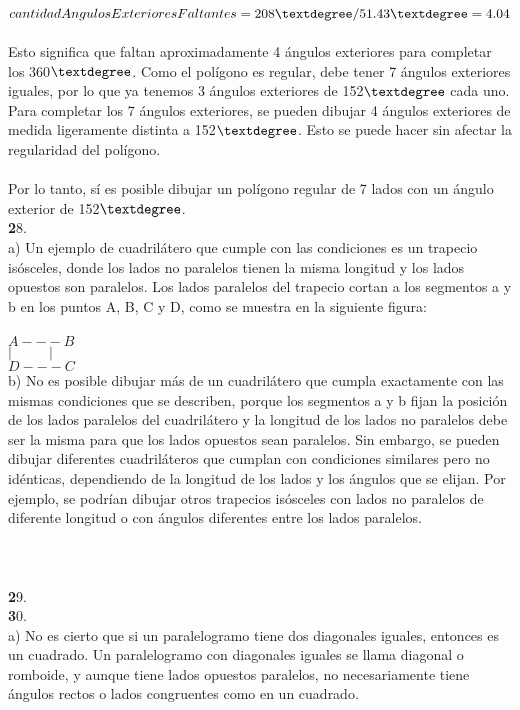 \documentclass{article}
\begin{document}
\\
$cantidadAngulosExterioresFaltantes = 208\textdegree / 51.43\textdegree = 4.04$\\
\\
Esto significa que faltan aproximadamente 4 ángulos exteriores para completar los 360$\textdegree$. Como el polígono es regular, debe tener 7 ángulos exteriores iguales, por lo que ya tenemos 3 ángulos exteriores de 152$\textdegree$ cada uno. Para completar los 7 ángulos exteriores, se pueden dibujar 4 ángulos exteriores de medida ligeramente distinta a 152$\textdegree$. Esto se puede hacer sin afectar la regularidad del polígono.\\
\\
Por lo tanto, sí es posible dibujar un polígono regular de 7 lados con un ángulo exterior de 152$\textdegree$.\\
{\textbf 28. }\\
a) Un ejemplo de cuadrilátero que cumple con las condiciones es un trapecio isósceles, donde los lados no paralelos tienen la misma longitud y los lados opuestos son paralelos. Los lados paralelos del trapecio cortan a los segmentos a y b en los puntos A, B, C y D, como se muestra en la siguiente figura:\\
\\
$A---B$\\
$|\ \ \ \ \ \ \ \ \ \ \ \ |$\\
$D---C$\\
b) No es posible dibujar más de un cuadrilátero que cumpla exactamente con las mismas condiciones que se describen, porque los segmentos a y b fijan la posición de los lados paralelos del cuadrilátero y la longitud de los lados no paralelos debe ser la misma para que los lados opuestos sean paralelos. Sin embargo, se pueden dibujar diferentes cuadriláteros que cumplan con condiciones similares pero no idénticas, dependiendo de la longitud de los lados y los ángulos que se elijan. Por ejemplo, se podrían dibujar otros trapecios isósceles con lados no paralelos de diferente longitud o con ángulos diferentes entre los lados paralelos.\\
\\
\\
\\
{\textbf 29. }\\
{\textbf 30. }\\
a) No es cierto que si un paralelogramo tiene dos diagonales iguales, entonces es un cuadrado. Un paralelogramo con diagonales iguales se llama diagonal o romboide, y aunque tiene lados opuestos paralelos, no necesariamente tiene ángulos rectos o lados congruentes como en un cuadrado.\\
\end{document}
